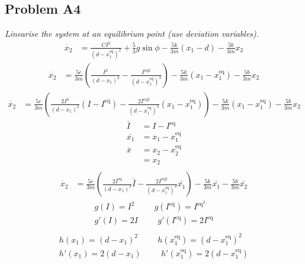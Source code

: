 \subsection*{Problem A4} \emph{ Linearise the system at an equilibrium point (use deviation variables).}
    \begin{align}
        {\dot{x_2}} &= {\frac{CI^2}{(d -{x_1^\text{eq}})^2}}+{\frac{5}{3}g\sin{\phi}}-{\frac{5k}{3m}{(x_1 - d)}}-{\frac{5b}{3m}{x_2}}\nonumber
    \end{align}
    \begin{align}
        {\dot{x_2}} &= {\frac{5c}{3m}( \frac{I^2}{(d -{x_1})^2} -  \frac{I^{\text{eq}2}}{(d -{x_1^\text{eq}})^2})}-{\frac{5k}{3m}{(x_1 -
        {x_1^\text{eq}})}}-{\frac{5b}{3m}{x_2}}\nonumber
    \end{align}
    \begin{align}
        {\dot{x_2}} &= {\frac{5c}{3m}( \frac{2I^2}{(d -{x_1})^2}(I - I^\text{eq}) -  \frac{2I^{\text{eq}2}}{(d -{x_1^\text{eq}})^3}(x_1 - {x_1^\text{eq}}))}-{\frac{5k}{3m}{(x_1 -
        {x_1^\text{eq}})}}-{\frac{5b}{3m}{x_2}}\nonumber
    \end{align}
    \begin{align} 
        \nonumber 
        \bar{I} &= I - I^\text{eq} \\ \nonumber 
        \bar{x_1} &= {x_1} - {x_1^\text{eq}} \\ \nonumber
        \bar{x} &= {x_2} - {x_2^\text{eq}} \\ \nonumber &= {x_2} \\ \nonumber
    \end{align}
    \begin{align}
        {\dot{x_2}} &= {\frac{5c}{3m}( \frac{2I^\text{eq}}{(d -{x_1})^2}\bar{I} -  \frac{2I^{\text{eq}2}}{(d -{x_1^\text{eq}})^3}\bar{x_1})}-{\frac{5k}{3m}{\bar{x_1}}}-{\frac{5b}{3m}\bar{x_2}}\nonumber
    \end{align}
    \begin{align}\nonumber
        {g(I) = I^2}   \hspace{1cm} {g(I^\text{eq}) = I^\text{eq}^2 } \\ \nonumber
        {g'(I) = 2I}   \hspace{1cm} {g'(I^\text{eq}) = 2I^\text{eq} } \\ \nonumber
    \end{align}
    \begin{align}\nonumber
        {h(x_1) = (d -{x_1})^2}   \hspace{1cm} {h(x_1^\text{eq}) = (d -{x_1^\text{eq}})^2} \\ \nonumber
        {h'(x_1) = 2(d -{x_1})}   \hspace{1cm} {h'(x_1^\text{eq}) = 2(d -{x_1^\text{eq}})} \\ \nonumber
    \end{align}

